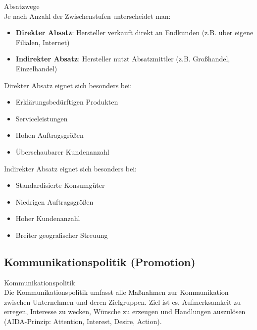 \begin{definition}{Absatzwege}\\
Je nach Anzahl der Zwischenstufen unterscheidet man:
\begin{itemize}
    \item \textbf{Direkter Absatz}: Hersteller verkauft direkt an Endkunden (z.B. über eigene Filialen, Internet)
    \item \textbf{Indirekter Absatz}: Hersteller nutzt Absatzmittler (z.B. Großhandel, Einzelhandel)
\end{itemize}

Direkter Absatz eignet sich besonders bei:
\begin{itemize}
    \item Erklärungsbedürftigen Produkten
    \item Serviceleistungen
    \item Hohen Auftragsgrößen
    \item Überschaubarer Kundenanzahl
\end{itemize}

Indirekter Absatz eignet sich besonders bei:
\begin{itemize}
    \item Standardisierte Konsumgüter
    \item Niedrigen Auftragsgrößen
    \item Hoher Kundenanzahl
    \item Breiter geografischer Streuung
\end{itemize}
\end{definition}

\subsection{Kommunikationspolitik (Promotion)}

\begin{definition}{Kommunikationspolitik}\\
Die Kommunikationspolitik umfasst alle Maßnahmen zur Kommunikation zwischen Unternehmen und deren Zielgruppen. Ziel ist es, Aufmerksamkeit zu erregen, Interesse zu wecken, Wünsche zu erzeugen und Handlungen auszulösen (AIDA-Prinzip: Attention, Interest, Desire, Action).
\end{definition}

